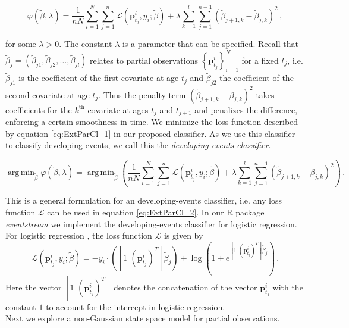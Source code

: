 \documentclass[11pt]{article}
\DeclareMathOperator*{\argmin}{arg\,min}
\begin{document}
	\begin{equation}\label{eq:ExtParCl_1}
	 \varphi\left(\tilde{\beta}, \lambda \right)  = \frac{1}{nN} \sum_{i=1}^N \sum_{j=1}^n \mathscr{L} \left( \mathbf{p}^i_{t_j},y_i;\tilde{\beta} \right) + \lambda \sum_{k=1}^l\sum_{j=1}^{n-1} \left(\tilde{\beta}_{j+1,k} - \tilde{\beta}_{j,k}  \right)^2  \, ,
	\end{equation}
	
	\noindent
	for some $\lambda >0 $. The constant $\lambda$ is a parameter that can be specified.  Recall that $\tilde{\beta}_j = \left( \tilde{\beta}_{j1}, \tilde{\beta}_{j2}, \ldots, \tilde{\beta}_{jl} \right)$ relates to partial observations  $\left \{ \mathbf{p}^i_{t_j} \right \}_{i=1}^N$ for a fixed $t_j$, i.e.  $\tilde{\beta}_{j1}$ is the coefficient of the first covariate at age $t_j$ and $\tilde{\beta}_{j2}$ the coefficient of the second covariate at age $t_j$. Thus the penalty term  $ \left(\tilde{\beta}_{j+1,k} - \tilde{\beta}_{j,k}  \right)^2$ takes coefficients for the $k^{\text{th}}$ covariate at ages $t_j$ and $t_{j+1}$ and penalizes the difference, enforcing a certain smoothness in time. We minimize the loss function described by equation \eqref{eq:ExtParCl_1} in our proposed classifier. As we use this classifier to classify developing events, we call this the {\it developing-events classifier}. 
	
	\begin{equation}\label{eq:ExtParCl_2}
	\argmin_{\tilde{\beta}}  \varphi\left(\tilde{\beta}, \lambda \right)  = 	\argmin_{\tilde{\beta}} \left( \frac{1}{nN} \sum_{i=1}^N \sum_{j=1}^n \mathscr{L} \left( \mathbf{p}^i_{t_j},y_i;\tilde{\beta} \right) + \lambda \sum_{k=1}^l\sum_{j=1}^{n-1} \left(\tilde{\beta}_{j+1,k} - \tilde{\beta}_{j,k}  \right)^2 \right) \, .
	\end{equation}
	
	
	This is a general formulation for an developing-events classifier, i.e. any loss function $\mathscr{L}$ can be used in equation \eqref{eq:ExtParCl_2}. In our R package {\it eventstream} we implement the developing-events classifier for logistic regression. For logistic regression \cite{friedman2001elements}, the loss function $\mathscr{L}$ is given by
	\begin{equation}\label{eq:LogReg}
	\mathscr{L} \left( \mathbf{p}^i_{t_j},y_i;\tilde{\beta} \right)  =  -  y_i \cdot \left( \left[ 1 \, \, \left( \mathbf{p}^i_{t_j}\right)^T \right] \tilde{\beta}_{j} \right) + \log \left( 1+ e^{ \left[ 1 \, \, \left( \mathbf{p}^i_{t_j}\right)^T \right] \tilde{\beta}_{j}} \right) \, .
	\end{equation}
	\noindent
	Here the vector $\left[ 1 \, \, \left( \mathbf{p}^i_{t_j}\right)^T \right]$ denotes the concatenation of the vector $\mathbf{p}^i_{t_j}$ with the constant $1$ to account for the intercept in logistic regression. \\ %
	\noindent
	Next we explore a non-Gaussian state space model for partial observations. 
	
\end{document}

